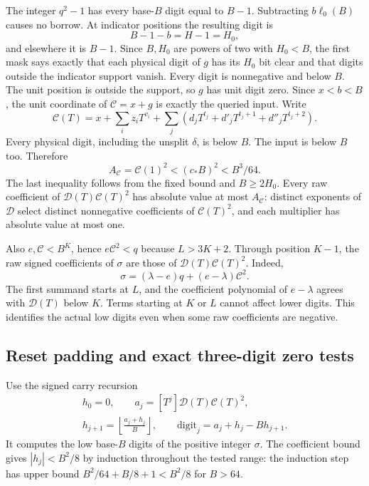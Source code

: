 The integer $q^2-1$ has every base-$B$ digit equal to $B-1$.
Subtracting $b\ell_0(B)$ causes no borrow. At indicator
positions the resulting digit is
\[
 B-1-b=H-1=H_0,
\]
and elsewhere it is $B-1$. Since $B,H_0$ are powers of two
with $H_0<B$, the first mask says exactly that each physical
digit of $g$ has its $H_0$ bit clear and that digits outside
the indicator support vanish. Every digit is nonnegative and
below $B$. The unit position is outside the support, so $g$
has unit digit zero. Since $x<b<B$, the unit coordinate of
$\mathcal C=x+g$ is exactly the queried input. Write
\[
 \mathcal C(T)=x+\sum_i z_iT^{v_i}
       +\sum_j(d_jT^{t_j}+d'_jT^{t_j+1}+d''_jT^{t_j+2}).
\]
Every physical digit, including the unsplit $\delta$, is below
$B$. The input is below $B$ too. Therefore
\begin{equation}\label{eq:affine-radix-coefficient-bound}
 A_{\mathcal C}=\mathcal C(1)^2<(c_*B)^2<B^3/64.
\end{equation}
The last inequality follows from the fixed bound and $B\ge2H_0$.
Every raw coefficient of $\mathcal D(T)\mathcal C(T)^2$ has
absolute value at most $A_{\mathcal C}$: distinct exponents
of $\mathcal D$ select distinct nonnegative coefficients of
$\mathcal C(T)^2$, and each multiplier has absolute value at
most one.

Also $e,\mathcal C<B^K$, hence $e\mathcal C^2<q$ because
$L>3K+2$. Through position $K-1$, the raw signed coefficients
of $\sigma$ are those of $\mathcal D(T)\mathcal C(T)^2$.
Indeed,
\[
 \sigma=(\lambda-e)q+(e-\lambda)\mathcal C^2.
\]
The first summand starts at $L$, and the coefficient polynomial
of $e-\lambda$ agrees with $\mathcal D(T)$ below $K$.
Terms starting at $K$ or $L$ cannot affect lower digits.
This identifies the actual low digits even when some raw
coefficients are negative.

\subsection{Reset padding and exact three-digit zero tests}

Use the signed carry recursion
\begin{equation}\label{eq:affine-radix-carry}
 \begin{gathered}
 h_0=0,\qquad a_j=[T^j]\mathcal D(T)\mathcal C(T)^2,\\
 h_{j+1}=\left\lfloor\frac{a_j+h_j}{B}\right\rfloor,
 \qquad\mathrm{digit}_j=a_j+h_j-Bh_{j+1}.
 \end{gathered}
\end{equation}
It computes the low base-$B$ digits of the positive integer
$\sigma$. The coefficient bound gives $|h_j|<B^2/8$ by
induction throughout the tested range: the induction step has
upper bound $B^2/64+B/8+1<B^2/8$ for $B>64$.

